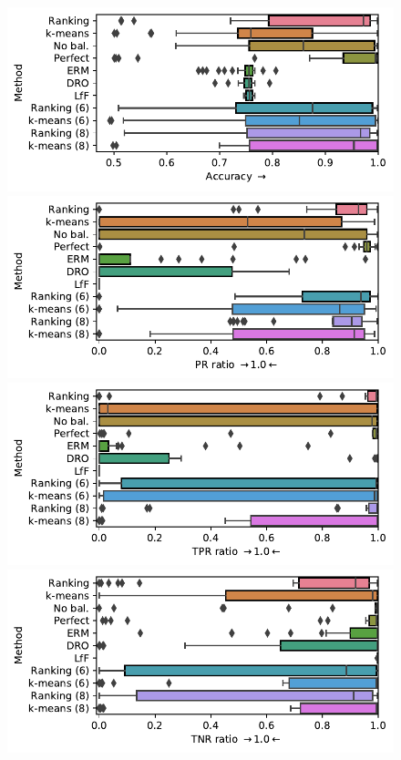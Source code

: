 \begin{figure}[htp]
  \centering
  \includegraphics[width=0.8\columnwidth]{paper3/figures/cmnist_2v4_miss_s_overcluster_acc.pdf}
  \includegraphics[width=0.8\columnwidth]{paper3/figures/cmnist_2v4_miss_s_overcluster_prr.pdf}
  \includegraphics[width=0.8\columnwidth]{paper3/figures/cmnist_2v4_miss_s_overcluster_tprr.pdf}
  \includegraphics[width=0.8\columnwidth]{paper3/figures/cmnist_2v4_miss_s_overcluster_tnrr.pdf}

\end{figure}
